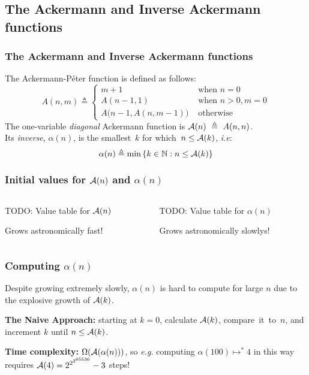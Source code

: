 \subsection*{The Ackermann and Inverse Ackermann functions}
\begin{frame}
\frametitle{The Ackermann and Inverse Ackermann functions}
\label{defn: ack}
	The Ackermann-P\'eter function is defined as follows:
	\begin{equation}
	\label{eq:ackermann}
	A(n, m) \triangleq \begin{cases}
	m + 1 & \text{ when } n = 0 \\
	A(n-1, 1) & \text{ when } n > 0, m = 0 \\
	A\big(n-1, A(n, m-1)\big) & \text{ otherwise}
	\end{cases}
	\end{equation}
	The one-variable \emph{diagonal} Ackermann function is $\mathcal{A}(n)~\triangleq~A(n, n)$.\\[5pt]
	
	Its \emph{inverse}, $\alpha(n)$, is the smallest~$k$ for
	which~$n \le \mathcal{A}(k)$, \emph{i.e}:
	\begin{equation*}
	\alpha(n) \triangleq \min\left\{k\in \mathbb{N} : n \le \mathcal{A}(k)\right\}
	\end{equation*}
\end{frame}


\begin{frame}
\frametitle{Initial values for $\mathcal{A}(n)$ and $\alpha(n)$}
\begin{columns}[T]
	\begin{column}{0.5\textwidth}
		TODO: Value table for $\mathcal{A}(n)$
		
		Grows astronomically fast!
	\end{column}

  \begin{column}{0.5\textwidth}
  	TODO: Value table for $\alpha(n)$
  	
  	Grows astronomically slowlys!
  \end{column}
\end{columns}
\end{frame}


\begin{frame}
\frametitle{Computing $\alpha(n)$}
Despite growing extremely slowly, $\alpha(n)$ is hard to compute for large $n$ due to the explosive growth of $\mathcal{A}(k)$.

\bigskip

\textbf{The Naive Approach:} starting at $k=0$, calculate $\mathcal{A}(k)$,
compare~it~to~$n$, and increment $k$ until $n \le \mathcal{A}(k)$.

\bigskip

\textbf{Time complexity:} $\Omega(\mathcal{A}(\alpha(n)))$,
so \emph{e.g.} computing $\alpha(100) \mapsto^{*} 4$ in this way requires
$\mathcal{A}(4) = 2^{2^{2^{65536}}}-3$ steps!
\end{frame}


